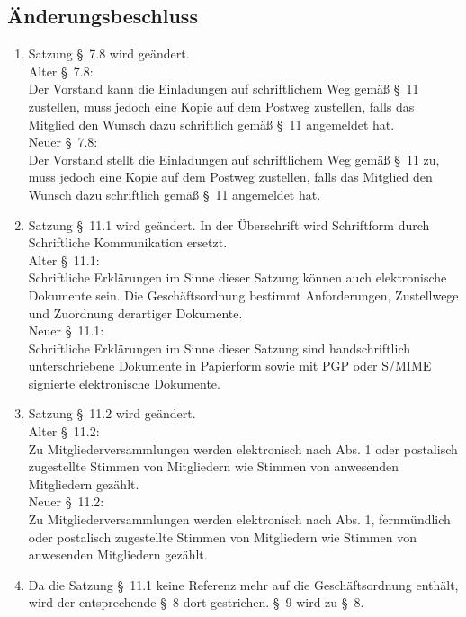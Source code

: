 \documentclass[10pt,a4paper]{scrartcl}
\newcommand{\qs}[1]{\glqq#1\grqq}
\begin{document}
\subsection*{{\"A}nderungsbeschluss}
	\begin{enumerate}
		\item Satzung \S\ 7.8 wird ge{\"a}ndert.\\
			  Alter \S\ 7.8:\\
			  \qs{Der Vorstand kann die Einladungen auf schriftlichem Weg
			  gem{\"a}{\ss} \S \ 11 zustellen, muss jedoch eine Kopie auf dem Postweg
			  zustellen, falls das Mitglied den Wunsch dazu schriftlich gem{\"a}{\ss}
			  \S \ 11 angemeldet hat.}\\
			  Neuer \S\ 7.8:\\
			  \qs{Der Vorstand stellt die Einladungen auf schriftlichem Weg
			  gem{\"a}{\ss} \S \ 11 zu, muss jedoch eine Kopie auf dem Postweg
			  zustellen, falls das Mitglied den Wunsch dazu schriftlich gem{\"a}{\ss}
			  \S \ 11 angemeldet hat.}
		\item Satzung \S\ 11.1 wird ge{\"a}ndert. In der {\"U}berschrift wird \qs{Schriftform} durch \qs{Schriftliche Kommunikation} ersetzt.\\
			  Alter \S\ 11.1:\\
			  \qs{Schriftliche Erkl{\"a}rungen im Sinne dieser Satzung
			  k{\"o}nnen auch elektronische Dokumente sein. Die Gesch{\"a}ftsordnung
			  bestimmt Anforderungen, Zustellwege und Zuordnung derartiger Dokumente.}\\
			  Neuer \S\ 11.1:\\
			  \qs{Schriftliche Erkl{\"a}rungen im Sinne dieser Satzung
			  sind handschriftlich unterschriebene Dokumente in Papierform sowie
			  mit PGP oder S/MIME signierte elektronische Dokumente.}
		\item Satzung \S\ 11.2 wird  ge{\"a}ndert.\\
			  Alter \S\ 11.2:\\
			  \qs{Zu Mitgliederversammlungen werden elektronisch nach Abs. 1
			  oder postalisch zugestellte Stimmen von Mitgliedern wie Stimmen von anwesenden
			  Mitgliedern gez{\"a}hlt.}\\
			  Neuer \S\ 11.2:\\
			  \qs{Zu Mitgliederversammlungen werden elektronisch nach Abs. 1,
			  fernm{\"u}ndlich oder postalisch zugestellte Stimmen von Mitgliedern wie Stimmen
			  von anwesenden Mitgliedern gez{\"a}hlt.}
		\item Da die Satzung \S\ 11.1 keine Referenz mehr auf die Gesch{\"a}ftsordnung enth{\"a}lt,
			  wird der entsprechende \S\ 8 dort gestrichen. \S\ 9 wird zu \S\ 8.\\
	\end{enumerate}
\end{document}
